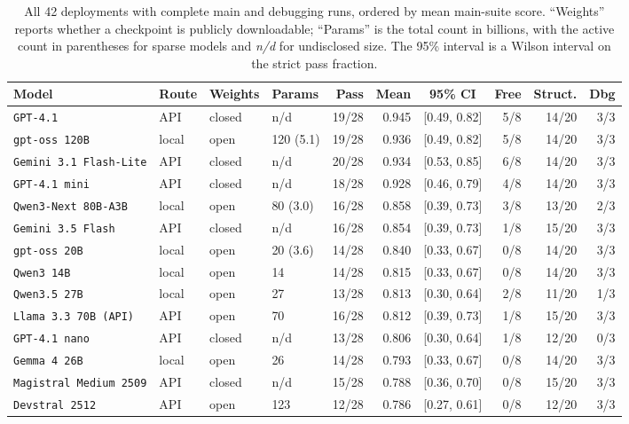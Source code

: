 \begin{table}[!htbp]
\centering\footnotesize\setlength{\tabcolsep}{3.2pt}
\renewcommand{\arraystretch}{0.93}
\caption{All 42 deployments with complete main and debugging runs, ordered by mean main-suite score.
``Weights'' reports whether a checkpoint is publicly downloadable; ``Params'' is the total count in
billions, with the active count in parentheses for sparse models and \emph{n/d} for undisclosed size.
The 95\% interval is a Wilson interval on the strict pass fraction.}
\label{tab:leaderboard}
\begin{tabular}{@{}llllrrcrrr@{}}
\toprule
Model & Route & Weights & Params & Pass & Mean & 95\% CI & Free & Struct. & Dbg \\
\midrule
\texttt{GPT-4.1} & API & closed & n/d & 19/28 & 0.945 & [0.49, 0.82] & 5/8 & 14/20 & 3/3 \\
\texttt{gpt-oss 120B} & local & open & 120 (5.1) & 19/28 & 0.936 & [0.49, 0.82] & 5/8 & 14/20 & 3/3 \\
\texttt{Gemini 3.1 Flash-Lite} & API & closed & n/d & 20/28 & 0.934 & [0.53, 0.85] & 6/8 & 14/20 & 3/3 \\
\texttt{GPT-4.1 mini} & API & closed & n/d & 18/28 & 0.928 & [0.46, 0.79] & 4/8 & 14/20 & 3/3 \\
\texttt{Qwen3-Next 80B-A3B} & local & open & 80 (3.0) & 16/28 & 0.858 & [0.39, 0.73] & 3/8 & 13/20 & 2/3 \\
\texttt{Gemini 3.5 Flash} & API & closed & n/d & 16/28 & 0.854 & [0.39, 0.73] & 1/8 & 15/20 & 3/3 \\
\texttt{gpt-oss 20B} & local & open & 20 (3.6) & 14/28 & 0.840 & [0.33, 0.67] & 0/8 & 14/20 & 3/3 \\
\texttt{Qwen3 14B} & local & open & 14 & 14/28 & 0.815 & [0.33, 0.67] & 0/8 & 14/20 & 3/3 \\
\texttt{Qwen3.5 27B} & local & open & 27 & 13/28 & 0.813 & [0.30, 0.64] & 2/8 & 11/20 & 1/3 \\
\texttt{Llama 3.3 70B (API)} & API & open & 70 & 16/28 & 0.812 & [0.39, 0.73] & 1/8 & 15/20 & 3/3 \\
\texttt{GPT-4.1 nano} & API & closed & n/d & 13/28 & 0.806 & [0.30, 0.64] & 1/8 & 12/20 & 0/3 \\
\texttt{Gemma 4 26B} & local & open & 26 & 14/28 & 0.793 & [0.33, 0.67] & 0/8 & 14/20 & 3/3 \\
\texttt{Magistral Medium 2509} & API & closed & n/d & 15/28 & 0.788 & [0.36, 0.70] & 0/8 & 15/20 & 3/3 \\
\texttt{Devstral 2512} & API & open & 123 & 12/28 & 0.786 & [0.27, 0.61] & 0/8 & 12/20 & 3/3 \\

\end{tabular}
\end{table}
